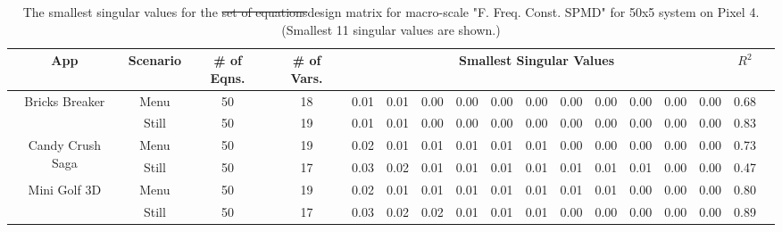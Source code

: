 \begin{table}[tb]
\centering
{\small
    \caption{The {\color{blue}smallest }singular values for the \st{set of equations}{\color{blue}design matrix} for macro-scale "F. Freq. Const. SPMD" for 50x5 system on Pixel 4. (Smallest 11 singular values are shown.)}
    \vspace{-0.1in}
    \begin{tabular}{|c|c|c|c|c|c|c|c|c|c|c|c|c|c|c|c|c|}
    \hline
        App & Scenario & \# of Eqns. & \# of Vars. &  \multicolumn{11}{c|}{Smallest  Singular Values} & $R^{2}$ \\
        \hline
         \multirow{2}{15mm}{Bricks Breaker} & Menu & 50 & 18 & 0.01  & 0.01  & 0.00  & 0.00  & 0.00  & 0.00  & 0.00  & 0.00  & 0.00  & 0.00  & 0.00 & 0.68 \\
         \cline{2-16}
         & Still &  50 & 19 & 0.01  & 0.01  & 0.00  & 0.00  & 0.00  & 0.00  & 0.00  & 0.00  & 0.00  & 0.00  & 0.00 & 0.83 \\
         \hline
        \multirow{2}{15mm}{Candy Crush Saga} & Menu &  50 & 19  & 0.02  & 0.01  & 0.01  & 0.01  & 0.01  & 0.01  & 0.00  & 0.00  & 0.00  & 0.00  & 0.00 & 0.73 \\
         \cline{2-16}
         & Still & 50 & 17  & 0.03  & 0.02  & 0.01  & 0.01  & 0.01  & 0.01  & 0.01  & 0.01  & 0.01  & 0.00  & 0.00 & 0.47 \\
         \hline
        \multirow{2}{15mm}{Mini Golf 3D} & Menu & 50 & 19  & 0.02  & 0.01  & 0.01  & 0.01  & 0.01  & 0.01  & 0.01  & 0.01  & 0.00  & 0.00  & 0.00 & 0.80 \\
        \cline{2-16}
	     & Still & 50 & 17  & 0.03  & 0.02  & 0.02  & 0.01  & 0.01  & 0.01  & 0.00  & 0.00  & 0.00  & 0.00  & 0.00 & 0.89 \\
	     \hline
    \end{tabular}
    \label{tab:macro_rank_singular}
    \vspace{-0.1in}
}
\end{table}

